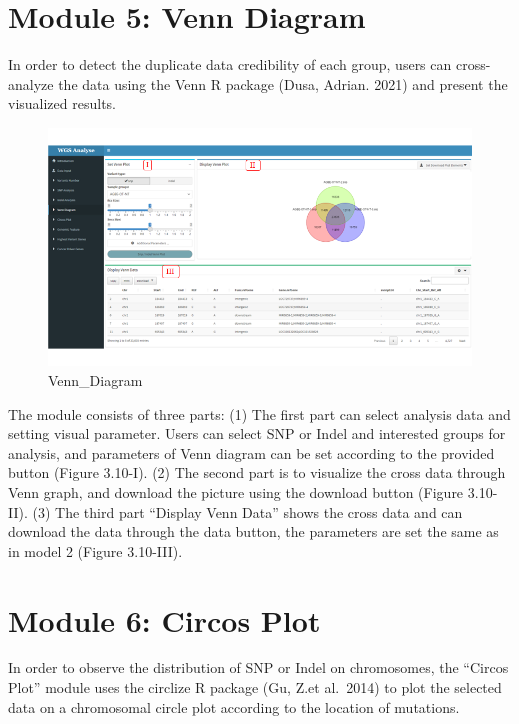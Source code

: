 \documentclass[
]{book}
\theoremstyle{definition}
\theoremstyle{definition}
\theoremstyle{definition}
\theoremstyle{definition}
\theoremstyle{remark}
\begin{document}
\hypertarget{module-5-venn-diagram}{%
\section{Module 5: Venn Diagram}\label{module-5-venn-diagram}}

In order to detect the duplicate data credibility of each group, users can cross-analyze the data using the Venn R package (Dusa, Adrian. 2021) and present the visualized results.

\begin{figure}
\includegraphics[width=1\linewidth]{figure/4.Venn_Diagram_1} \caption{Venn_Diagram}\label{fig:unnamed-chunk-15}
\end{figure}

The module consists of three parts: (1) The first part can select analysis data and setting visual parameter. Users can select SNP or Indel and interested groups for analysis, and parameters of Venn diagram can be set according to the provided button (Figure 3.10-I). (2) The second part is to visualize the cross data through Venn graph, and download the picture using the download button (Figure 3.10-II). (3) The third part ``Display Venn Data'' shows the cross data and can download the data through the data button, the parameters are set the same as in model 2 (Figure 3.10-III).

\hypertarget{module-6-circos-plot}{%
\section{Module 6: Circos Plot}\label{module-6-circos-plot}}

In order to observe the distribution of SNP or Indel on chromosomes, the ``Circos Plot'' module uses the circlize R package (Gu, Z.et al.~2014) to plot the selected data on a chromosomal circle plot according to the location of mutations.
\end{document}
